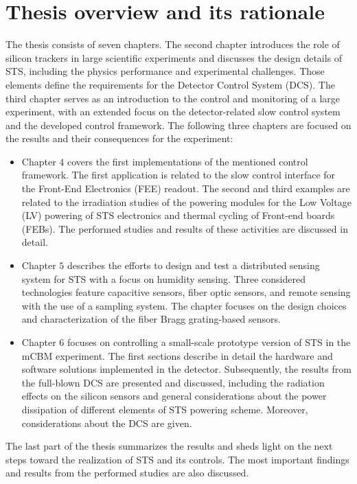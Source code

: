 \section{Thesis overview and its rationale}
The thesis consists of seven chapters. The second chapter introduces the role of silicon trackers in large scientific experiments and discusses the design details of \gls{STS}, including the physics performance and experimental challenges. Those elements define the requirements for the Detector Control System (\gls{DCS}). The third chapter serves as an introduction to the control and monitoring of a large experiment, with an extended focus on the detector-related slow control system and the developed control framework. The following three chapters are focused on the results and their consequences for the experiment:
\begin{itemize}
    \item Chapter $4$ covers the first implementations of the mentioned control framework. The first application is related to the slow control interface for the Front-End Electronics (\gls{FEE}) readout. The second and third examples are related to the irradiation studies of the powering modules for the Low Voltage (\gls{LV}) powering of \gls{STS} electronics and thermal cycling of Front-end boards (\glspl{FEB}). The performed studies and results of these activities are discussed in detail.
    \item Chapter $5$ describes the efforts to design and test a distributed sensing system for \gls{STS} with a focus on humidity sensing. Three considered technologies feature capacitive sensors, fiber optic sensors, and remote sensing with the use of a sampling system. The chapter focuses on the design choices and characterization of the fiber Bragg grating-based sensors. 
    \item Chapter $6$ focuses on controlling a small-scale prototype version of \gls{STS} in the \gls{mCBM} experiment. The first sections describe in detail the hardware and software solutions implemented in the detector. Subsequently, the results from the full-blown \gls{DCS} are presented and discussed, including the radiation effects on the silicon sensors and general considerations about the power dissipation of different elements of \gls{STS} powering scheme. Moreover, considerations about the \gls{DCS} are given. 
\end{itemize}
The last part of the thesis summarizes the results and sheds light on the next steps toward the realization of \gls{STS} and its controls. The most important findings and results from the performed studies are also discussed.